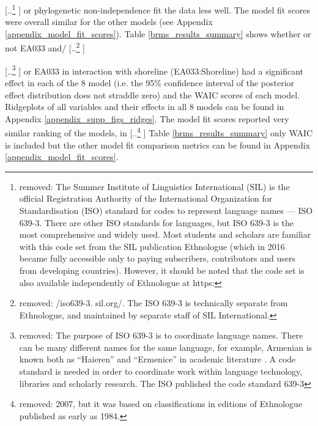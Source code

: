 \documentclass[unnumsec,webpdf,modern,medium]{oup-authoring-template}
\providecommand{\DIFaddtex}[1]{{\protect\color{blue} \sf #1}} %
\providecommand{\DIFdeltex}[1]{{\protect\color{red} [..\footnote{removed: #1} ]}} %
\providecommand{\DIFaddbegin}{} %
\providecommand{\DIFaddend}{} %
\providecommand{\DIFdelbegin}{} %
\providecommand{\DIFdelend}{} %
\providecommand{\DIFadd}[1]{\texorpdfstring{\DIFaddtex{#1}}{#1}} %
\providecommand{\DIFdel}[1]{\texorpdfstring{\DIFdeltex{#1}}{}} %
\newcommand{\DIFscaledelfig}{0.5}
\newlength{\DIFdelgraphicswidth} %
\newlength{\DIFdelgraphicsheight} %
\newcommand{\DIFaddincludegraphics}[2][]{{\color{blue}\fbox{\DIFOincludegraphics[#1]{#2}}}} %
\newcommand{\DIFdelincludegraphics}[2][]{%
\sbox{\DIFdelgraphicsbox}{\DIFOincludegraphics[#1]{#2}}%
\settoboxwidth{\DIFdelgraphicswidth}{\DIFdelgraphicsbox} %
\settoboxtotalheight{\DIFdelgraphicsheight}{\DIFdelgraphicsbox} %
\scalebox{\DIFscaledelfig}{%
\parbox[b]{\DIFdelgraphicswidth}{\usebox{\DIFdelgraphicsbox}\\[-\baselineskip] \rule{\DIFdelgraphicswidth}{0em}}\llap{\resizebox{\DIFdelgraphicswidth}{\DIFdelgraphicsheight}{%
\setlength{\unitlength}{\DIFdelgraphicswidth}%
\begin{picture}(1,1)%
\thicklines\linethickness{2pt} %
{\color[rgb]{1,0,0}\put(0,0){\framebox(1,1){}}}%
{\color[rgb]{1,0,0}\put(0,0){\line( 1,1){1}}}%
{\color[rgb]{1,0,0}\put(0,1){\line(1,-1){1}}}%
\end{picture}%
}\hspace*{3pt}}} %
} %
\DeclareRobustCommand{\DIFaddbegin}{\DIFOaddbegin \let\includegraphics\DIFaddincludegraphics} %
\DeclareRobustCommand{\DIFaddend}{\DIFOaddend \let\includegraphics\DIFOincludegraphics} %
\DeclareRobustCommand{\DIFdelbegin}{\DIFOdelbegin \let\includegraphics\DIFdelincludegraphics} %
\DeclareRobustCommand{\DIFdelend}{\DIFOaddend \let\includegraphics\DIFOincludegraphics} %
\begin{document}
\DIFdel{The Summer Institute of Linguistics International (SIL) is the official Registration Authority of the International Organization for Standardisation (ISO) standard for codes to represent language names --- ISO 639-3. There are other ISO standards for languages, but ISO 639-3 is the most comprehensive and widely used. Most students and scholars are familiar with this code set from the SIL publication Ethnologue (which in 2016 became fully accessible only to paying subscribers, contributors and users from developing countries). However, it should be noted that the code set is also available independently of Ethnologue at https:}\DIFdelend \DIFaddbegin \DIFadd{or phylogenetic non-independence fit the data less well. The model fit scores were overall similar for the other models (see Appendix 
\ref{appendix_model_fit_scores}). Table \ref{brms_results_summary} shows whether or not EA033 and}\DIFaddend /\DIFdelbegin \DIFdel{/iso639-3. sil.org/. The ISO 639-3 is technically separate from Ethnologue, and maintained by separate staff of SIL International.
}%

\DIFdel{The purpose of ISO 639-3 is to coordinate language names. There can be many different names for the same language, for example, Armenian is known both as ``Haieren'' and ``Ermenice'' in academic literature \citep{multitree2014}. A code standard is needed in order to coordinate work within language technology, libraries and scholarly research. The ISO published the code standard 639-3 }\DIFdelend \DIFaddbegin \DIFadd{or EA033 in interaction with shoreline (EA033:Shoreline) had a significant effect in each of the 8 model (i.e. the 95\% confidence interval of the posterior effect distribution does not straddle zero) and the WAIC scores of each model. Ridgeplots of all variables and their effects in all 8 models can be found in Appendix \ref{appendix_supp_figs_ridges}. The model fit scores reported very similar ranking of the models, }\DIFaddend in \DIFdelbegin \DIFdel{2007, but it was based on classifications in editions of Ethnologue published as early as 1984. %
}\DIFdelend \DIFaddbegin \DIFadd{Table \ref{brms_results_summary} only WAIC is included but the other model fit comparison metrics can be found in Appendix \ref{appendix_model_fit_scores}.
}\DIFaddend 
\end{document}
